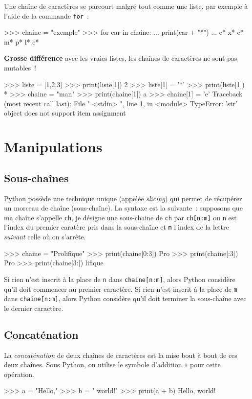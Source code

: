 Une chaîne de caractères se parcourt malgré tout comme une liste, par exemple à l'aide de la commande \texttt{for}~:
\begin{pythoncode}
>>> chaine = "exemple"
>>> for car in chaine:
...     print(car + "*")
...
e*
x*
e*
m*
p*
l*
e*
\end{pythoncode}
\textbf{Grosse différence} avec les vraies listes, les chaînes de caractères ne sont pas mutables~!
\begin{pythoncode}
>>> liste = [1,2,3]
>>> print(liste[1])
2
>>> liste[1] = '*'
>>> print(liste[1])
*
>>> chaine = "man"
>>> print(chaine[1])
a
>>> chaine[1] = 'e'
Traceback (most recent call last):
  File " <stdin> ", line 1, in <module>
TypeError: 'str' object does not support item assignment
\end{pythoncode}

\section{Manipulations}
\subsection{Sous-chaînes}
Python possède une technique unique (appelée \textit{slicing}) qui permet de récupérer un morceau de chaîne (sous-chaîne). La syntaxe est la suivante~: supposons que ma chaîne s'appelle \texttt{ch}, je désigne une sous-chaine de \texttt{ch} par \texttt{ch[n:m]} ou \texttt{n} est l'index du premier caratère pris dans la sous-chaîne et \texttt{m} l'index de la lettre \textit{suivant} celle où on s'arrête.
\begin{pythoncode}
>>> chaine = "Prolifique"
>>> print(chaine[0:3])
Pro
>>> print(chaine[:3])
Pro
>>> print(chaine[3:])
lifique
\end{pythoncode}
Si rien n'est inscrit à la place de \texttt{n} dans \texttt{chaine[n:m]}, alors Python considère qu'il doit commencer au premier caractère. Si rien n'est inscrit à la place de \texttt{m} dans \texttt{chaine[n:m]}, alors Python considère qu'il doit terminer la sous-chaîne avec le dernier caractère.


\subsection{Concaténation}
La \textit{concaténation} de deux chaînes de caractères est la mise bout à bout de ces deux chaînes. Sous Python, on utilise le symbole d'addition \texttt{+} pour cette opération.
\begin{pythoncode}
>>> a = "Hello,"
>>> b = " world!"
>>> print(a + b)
Hello, world!
\end{pythoncode}


